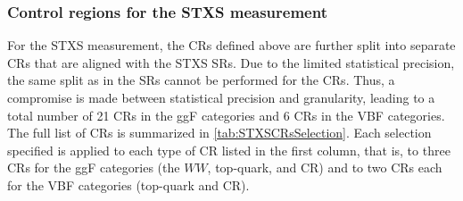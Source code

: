 \subsubsection{Control regions for the STXS measurement}
\label{subsubsec:stxs-crs}
For the STXS measurement, the CRs defined above are further split into separate CRs that are aligned with the STXS SRs. Due to the limited statistical precision, the same split as in the SRs cannot be performed for the CRs. Thus, a compromise is made between statistical precision and granularity, leading to a total number of 21 CRs in the ggF categories and 6 CRs in the VBF categories.  
The full list of CRs is summarized in \cref{tab:STXSCRsSelection}. 
Each selection specified is applied to each type of CR listed in the first column, that is, to three CRs for the ggF categories (the $WW$, top-quark, and \Ztautau CR) and to two CRs each for the VBF categories (top-quark and \Ztautau CR). 
\begin{table}[ht]
    \caption{
      Event selection criteria used to define the control regions used in the STXS measurement.
      The selections start from the nominal CR selections summarized in \cref{tab:CRsSelection}.
      }
  \label{tab:STXSCRsSelection}
  \centering
  \resizebox{\textwidth}{!}{
  
  }
  \end{table}


